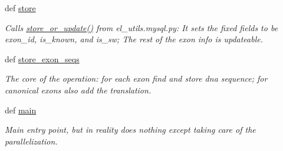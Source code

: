 \begin{DoxyCompactItemize}
def \hyperlink{namespace12__exon__seq__store_a6c9dc3a2f058425a6a487fc8b868d658}{store}
\begin{DoxyCompactList}\small\item\em Calls \hyperlink{namespaceel__utils_1_1mysql_ad1dbce5e2a628225a3aee9f4bb002d4b}{store\-\_\-or\-\_\-update()} from el\-\_\-utils.\-mysql.\-py\-: It sets the fixed fields to be exon\-\_\-id, is\-\_\-known, and is\-\_\-sw; The rest of the exon info is updateable. \end{DoxyCompactList}\item 
def \hyperlink{namespace12__exon__seq__store_a60046448e48836673785b159fbe34282}{store\-\_\-exon\-\_\-seqs}
\begin{DoxyCompactList}\small\item\em The core of the operation\-: for each exon find and store dna sequence; for canonical exons also add the translation. \end{DoxyCompactList}\item 
def \hyperlink{namespace12__exon__seq__store_a8517b3ef4d3826fd5ed3ee3b1bf8d539}{main}
\begin{DoxyCompactList}\small\item\em Main entry point, but in reality does nothing except taking care of the parallelization. \end{DoxyCompactList}\end{DoxyCompactItemize}


